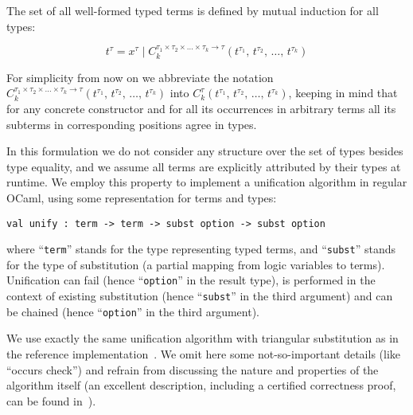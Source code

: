 The set of all well-formed typed terms is defined by mutual induction for all types:

$$
t^\tau=x^\tau\mid C_k^{\tau_1\times\tau_2\times\dots\times\tau_k\to\tau}(t^{\tau_1},\,t^{\tau_2},\,\dots,\,t^{\tau_k})
$$

For simplicity from now on we abbreviate the notation $C_k^{\tau_1\times\tau_2\times\dots\times\tau_k\to\tau}(t^{\tau_1},\,t^{\tau_2},\,\dots,\,t^{\tau_k})$ into
$C_k^\tau(t^{\tau_1},\,t^{\tau_2},\,\dots,\,t^{\tau_k})$, keeping in mind that for any concrete constructor and for all its occurrences
in arbitrary terms all its subterms in corresponding positions agree in types.

\begin{comment}
We need also to define the notion of a subterm  $t^\tau[p]$ of a term $t^\tau$ at given position $p$:

$$
\begin{array}{rcl}
 p=\epsilon\mid\{1, 2, 3,\dots\}\bullet p&-&\mbox{the set of positions}\\
 t^\tau[\epsilon]=t^\tau&-&\mbox{base case}\\
 C_k^\tau(t_1^{\tau_1},\,t_2^{\tau_2},\dots,\,t_k^{\tau_k})[i\bullet p]=t_i^{\tau_i}[p], 1\le i \le k&-&\mbox{inductive case}
\end{array}
$$
\end{comment}

In this formulation we do not consider any structure over the set of types besides type equality, and we assume all terms are explicitly
attributed by their types at runtime. We employ this property to implement a unification algorithm in regular OCaml, using some
representation for terms and types:

\begin{lstlisting}[mathescape=true]
    val unify : term -> term -> subst option -> subst option
\end{lstlisting}

\noindent where ``\lstinline{term}'' stands for the type representing typed terms, and ``\lstinline{subst}'' stands for the type of
substitution (a partial mapping from logic variables to terms). Unification can fail (hence ``\lstinline{option}'' in the result type),
is performed in the context of existing substitution (hence ``\lstinline{subst}'' in the third argument) and can be
chained (hence ``\lstinline{option}'' in the third argument).

We use exactly the same unification algorithm with triangular substitution as in the reference implementation~\cite{MicroKanren}. We
omit here some not-so-important details (like ``occurs check'') and refrain from discussing the nature and properties of the algorithm
itself (an excellent description, including a certified correctness proof, can be found in~\cite{Kumar}).

